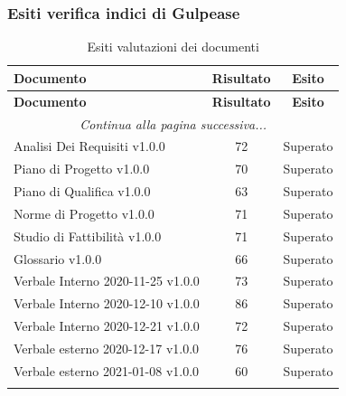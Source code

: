 \documentclass[../piano_di_qualifica.tex]{subfiles}
\begin{document}
\subsubsection{Esiti verifica indici di Gulpease}
\label{sub:verif_gul_RR}

\begin{center}
	\begin{longtable}{|l|c|c|}
		\hline
		\rowcolor{lightgray}
		\textbf{Documento}                 & \textbf{Risultato} & \textbf{Esito} \\
		\hline
		\endfirsthead
	
		\hline
		\rowcolor{lightgray}
		\textbf{Documento}                 & \textbf{Risultato} & \textbf{Esito} \\
		\hline
		\endhead
		
		\hline
		\multicolumn{3}{|c|}{\emph{Continua alla pagina successiva...}}\\
		\hline
		\endfoot
		\endlastfoot

		Analisi Dei Requisiti v1.0.0       & 72                 & Superato       \\
		Piano di Progetto v1.0.0           & 70                 & Superato       \\
		Piano di Qualifica v1.0.0          & 63                 & Superato       \\
		Norme di Progetto v1.0.0           & 71                 & Superato       \\
		Studio di Fattibilità v1.0.0       & 71                 & Superato       \\
		Glossario v1.0.0                   & 66                 & Superato       \\
		Verbale Interno 2020-11-25 v1.0.0  & 73                 & Superato       \\
		Verbale Interno 2020-12-10 v1.0.0  & 86                 & Superato       \\
		Verbale Interno 2020-12-21 v1.0.0  & 72                 & Superato       \\
		Verbale esterno 2020-12-17  v1.0.0 & 76                 & Superato       \\
		Verbale esterno 2021-01-08  v1.0.0 & 60                 & Superato       \\
		\hline
		\rowcolor{white}
		\caption{Esiti valutazioni dei documenti}
	\end{longtable}
\end{center}
\end{document}
